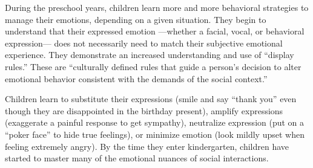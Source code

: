 During the preschool years, children learn more and more behavioral strategies
to manage their emotions, depending on a given situation. They begin to
understand that their expressed emotion —whether a facial, vocal, or behavioral
expression— does not necessarily need to match their subjective emotional
experience. They demonstrate an increased understanding and use of “display
rules.” These are “culturally defined rules that guide a person’s decision to
alter emotional behavior consistent with the demands of the social context.”
\cite{ZEMAN2006}

Children learn to substitute their expressions (smile and say “thank you” even
though they are disappointed in the birthday present), amplify expressions
(exaggerate a painful response to get sympathy), neutralize expression (put on
a “poker face” to hide true feelings), or minimize emotion (look mildly upset
when feeling extremely angry). By the time they enter kindergarten, children
have started to master many of the emotional nuances of social interactions.
\cite{Gerber2011}


